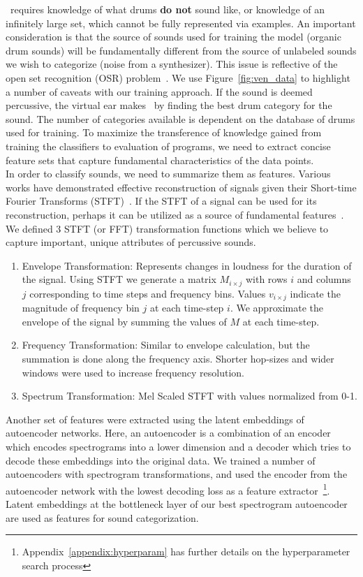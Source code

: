 \documentclass[runningheads,a4paper]{llncs}
\begin{document}
\decfirst~requires knowledge of what drums \textbf{do not} sound like, or knowledge of an infinitely large set, which cannot be fully represented via examples. An important consideration is that the source of sounds used for training the model (organic drum sounds) will be fundamentally different from the source of unlabeled sounds we wish to categorize (noise from a synthesizer). This issue is reflective of the open set recognition (OSR) problem~\cite{geng2020recent,mundt2019open}. We use Figure~\ref{fig:ven_data} to highlight a number of caveats with our training approach. If the sound is deemed percussive, the virtual ear makes \decsecond~by finding the best drum category for the sound. The number of categories available is dependent on the database of drums used for training. 
To maximize the transference of knowledge gained from training the classifiers to evaluation of programs, we need to extract concise feature sets that capture fundamental characteristics of the data points.\\

In order to classify sounds, we need to summarize them as features. Various works have demonstrated effective reconstruction of signals given their Short-time Fourier Transforms (STFT)~\cite{nawab1983signal,griffin1984signal}. If the STFT of a signal can be used for its reconstruction, perhaps it can be utilized as a source of fundamental features~\cite{lee2009unsupervised,hershey2017cnn}. We defined 3 STFT (or FFT) transformation functions which we believe to capture important, unique attributes of percussive sounds. 
\begin{enumerate}
\item Envelope Transformation: Represents changes in loudness for the duration of the signal. Using STFT we generate a matrix $M_{i \times j}$ with rows $i$ and columns $j$ corresponding to time steps and frequency bins. Values $v_{i \times j}$ indicate the magnitude of frequency bin $j$ at each time-step $i$. We approximate the envelope of the signal by summing the values of $M$ at each time-step. 
\item Frequency Transformation:  Similar to envelope calculation, but the summation is done along the frequency axis. Shorter hop-sizes and wider windows were used to increase frequency resolution. 
\item Spectrum Transformation: Mel Scaled STFT with values normalized from 0-1. 
\end{enumerate}

Another set of features were extracted using the latent embeddings of autoencoder networks. Here, an autoencoder is a combination of an encoder which encodes spectrograms into a lower dimension and a decoder which tries to decode these embeddings into the original data. We trained a number of autoencoders with spectrogram transformations, and used the encoder from the autoencoder network with the lowest decoding loss as a feature extractor~\footnote{Appendix~\ref{appendix:hyperparam} has further details on the hyperparameter search process}. Latent embeddings at the bottleneck layer of our best spectrogram autoencoder are used as features for sound categorization. 
\end{document}
